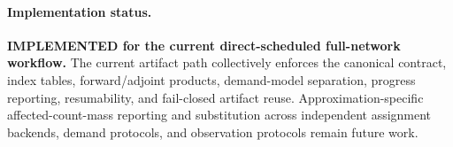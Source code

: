\paragraph{Implementation status.}
\textbf{IMPLEMENTED for the current direct-scheduled full-network workflow.}
The current artifact path collectively enforces the canonical contract, index
tables, forward/adjoint products, demand-model separation, progress reporting,
resumability, and fail-closed artifact reuse.  Approximation-specific
affected-count-mass reporting and substitution across independent assignment
backends, demand protocols, and observation protocols remain future work.
